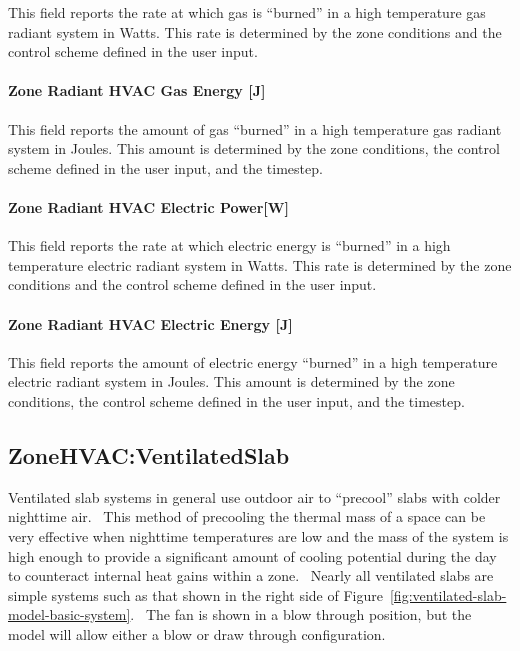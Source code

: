 This field reports the rate at which gas is ``burned'' in a high temperature gas radiant system in Watts. This rate is determined by the zone conditions and the control scheme defined in the user input.

\paragraph{Zone Radiant HVAC Gas Energy {[}J{]}}\label{zone-radiant-hvac-gas-energy-j}

This field reports the amount of gas ``burned'' in a high temperature gas radiant system in Joules. This amount is determined by the zone conditions, the control scheme defined in the user input, and the timestep.

\paragraph{Zone Radiant HVAC Electric Power{[}W{]}}\label{zone-radiant-hvac-electric-powerw}

This field reports the rate at which electric energy is ``burned'' in a high temperature electric radiant system in Watts. This rate is determined by the zone conditions and the control scheme defined in the user input.

\paragraph{Zone Radiant HVAC Electric Energy {[}J{]}}\label{zone-radiant-hvac-electric-energy-j-1}

This field reports the amount of electric energy ``burned'' in a high temperature electric radiant system in Joules. This amount is determined by the zone conditions, the control scheme defined in the user input, and the timestep.

\subsection{ZoneHVAC:VentilatedSlab}\label{zonehvacventilatedslab}

Ventilated slab systems in general use outdoor air to ``precool'' slabs with colder nighttime air.~ This method of precooling the thermal mass of a space can be very effective when nighttime temperatures are low and the mass of the system is high enough to provide a significant amount of cooling potential during the day to counteract internal heat gains within a zone.~ Nearly all ventilated slabs are simple systems such as that shown in the right side of Figure~\ref{fig:ventilated-slab-model-basic-system}.~ The fan is shown in a blow through position, but the model will allow either a blow or draw through configuration.

